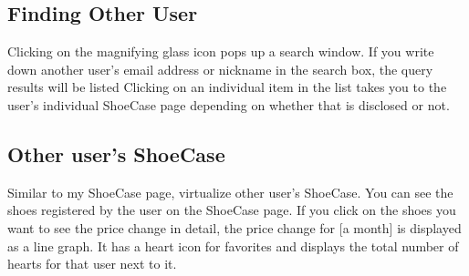\documentclass[conference]{IEEEtran}
\begin{document}
\subsection{Finding Other User}
Clicking on the magnifying glass icon pops up a search window.
If you write down another user's email address or nickname in the search box, the query results will be listed
Clicking on an individual item in the list takes you to the user's individual ShoeCase page depending on whether that is disclosed or not.\\

\subsection{Other user's ShoeCase}
Similar to my ShoeCase page, virtualize other user's ShoeCase.
You can see the shoes registered by the user on the ShoeCase page. 
If you click on the shoes you want to see the price change in detail, the price change for [a month] is displayed as a line graph. 
It has a heart icon for favorites and displays the total number of hearts for that user next to it.\\
\end{document}

